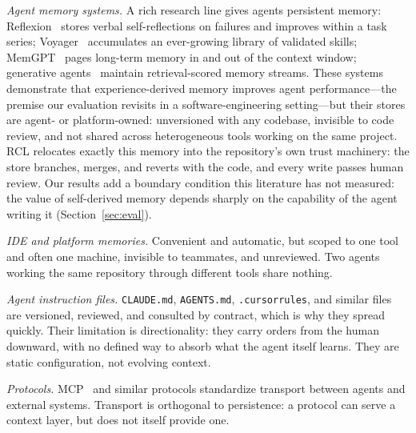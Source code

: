 \documentclass[sigconf,nonacm]{acmart}
\begin{document}
\emph{Agent memory systems.} A rich research line gives agents persistent memory:
Reflexion~\cite{shinn2023reflexion} stores verbal self-reflections on failures and
improves within a task series; Voyager~\cite{wang2023voyager} accumulates an
ever-growing library of validated skills; MemGPT~\cite{packer2023memgpt} pages
long-term memory in and out of the context window; generative
agents~\cite{park2023generative} maintain retrieval-scored memory streams. These
systems demonstrate that experience-derived memory improves agent
performance---the premise our evaluation revisits in a software-engineering
setting---but their stores are agent- or platform-owned: unversioned with any
codebase, invisible to code review, and not shared across heterogeneous tools
working on the same project. RCL relocates exactly this memory into the
repository's own trust machinery: the store branches, merges, and reverts with the
code, and every write passes human review. Our results add a boundary condition
this literature has not measured: the value of self-derived memory depends sharply
on the capability of the agent writing it (Section~\ref{sec:eval}).

\emph{IDE and platform memories.} Convenient and automatic, but scoped to one tool
and often one machine, invisible to teammates, and unreviewed. Two agents working
the same repository through different tools share nothing.

\emph{Agent instruction files.} \texttt{CLAUDE.md}, \texttt{AGENTS.md},
\texttt{.cursorrules}, and similar files are versioned, reviewed, and consulted by
contract, which is why they spread quickly. Their limitation is directionality:
they carry orders from the human downward, with no defined way to absorb what the
agent itself learns. They are static configuration, not evolving context.

\emph{Protocols.} MCP~\cite{mcp2024} and similar protocols standardize transport
between agents and external systems. Transport is orthogonal to persistence: a
protocol can serve a context layer, but does not itself provide one.
\end{document}
